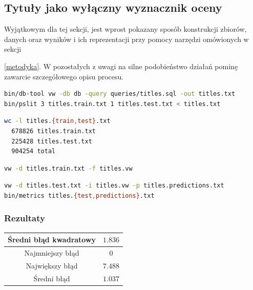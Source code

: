 \documentclass{article}
\begin{document}
\subsection{Tytuły jako wyłączny wyznacznik oceny}

Wyjątkowym dla tej sekcji, jest wprost pokazany sposób konstrukcji zbiorów, danych oraz wyników i ich reprezentacji przy pomocy narzędzi omówionych w sekcji {\ref{metodyka}. W pozostałych z uwagi na silne podobieństwo działań pominę zawarcie szczegółowego opisu procesu.



\begin{lstlisting}[language=bash,caption=Przygotowanie danych dla modelu i ewaluacji,label=query1]
bin/db-tool vw -db db -query queries/titles.sql -out titles.txt
bin/pslit 3 titles.train.txt 1 titles.test.txt < titles.txt
\end{lstlisting}

\begin{lstlisting}[language=bash,caption=Wielkości zbiorów]
wc -l titles.{train,test}.txt
  678826 titles.train.txt
  225428 titles.test.txt
  904254 total
\end{lstlisting}

\begin{lstlisting}[language=bash, caption=Generowanie modelu]
vw -d titles.train.txt -f titles.vw
\end{lstlisting}

\begin{lstlisting}[language=bash, caption=Ewaluacja modelu]
vw -d titles.test.txt -i titles.vw -p titles.predictions.txt
bin/metrics titles.{test,predictions}.txt
\end{lstlisting}

\subsubsection{Rezultaty}

\begin{center}
\begin{tabular}{ |c|c| }
\hline	Średni błąd kwadratowy & \( 1.836 \) \\
\hline	Najmniejszy błąd & \( 0 \) \\
\hline	Największy błąd & \( 7.488 \) \\
\hline	Średni błąd & \( 1.037 \) \\
\hline
\end{tabular}
\end{center}

}
\end{document}
